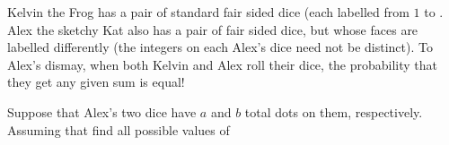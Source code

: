 Kelvin the Frog has a pair of standard fair sided dice (each labelled from $1$ to . Alex the sketchy Kat also has a pair of fair sided dice, but whose faces are labelled differently (the integers on each Alex's dice need not be distinct). To Alex's dismay, when both Kelvin and Alex roll their dice, the probability that they get any given sum is equal!

Suppose that Alex's two dice have $a$ and $b$ total dots on them, respectively. Assuming that  find all possible values of 